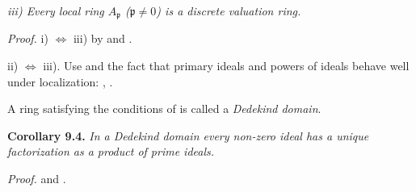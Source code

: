 \emph{iii) Every local ring \(A_\mathfrak p\) (\(\mathfrak p\neq0\)) is a discrete valuation ring.}

\noindent\emph{Proof.} i) \(\Longleftrightarrow\) iii) by  and .

ii) \(\Longleftrightarrow\) iii). Use  and the fact that primary ideals and powers of ideals behave well under localization: , . \proofbox

A ring satisfying the conditions of  is called a \emph{Dedekind domain}.

\noindent\textbf{Corollary 9.4.} \emph{In a Dedekind domain every non-zero ideal has a unique factorization as a product of prime ideals.}

\noindent\emph{Proof.}  and . \proofbox
